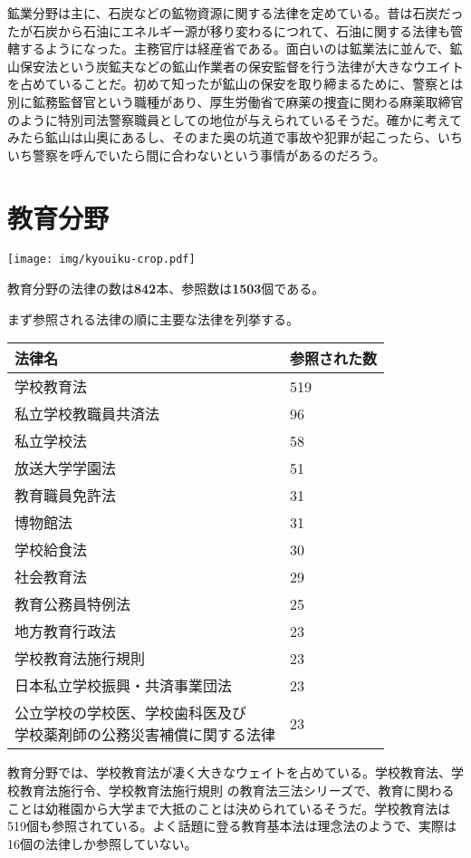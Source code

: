 \documentclass[a5j,openany,twoside]{jsbook}
\begin{document}
鉱業分野は主に、石炭などの鉱物資源に関する法律を定めている。昔は石炭だったが石炭から石油にエネルギー源が移り変わるにつれて、石油に関する法律も管轄するようになった。主務官庁は経産省である。面白いのは鉱業法に並んで、鉱山保安法という炭鉱夫などの鉱山作業者の保安監督を行う法律が大きなウエイトを占めていることだ。初めて知ったが鉱山の保安を取り締まるために、警察とは別に鉱務監督官という職種があり、厚生労働省で麻薬の捜査に関わる麻薬取締官のように特別司法警察職員としての地位が与えられているそうだ。確かに考えてみたら鉱山は山奥にあるし、そのまた奥の坑道で事故や犯罪が起こったら、いちいち警察を呼んでいたら間に合わないという事情があるのだろう。

\section{教育分野}


\texttt{[image: img/kyouiku-crop.pdf]}

教育分野の法律の数は\textbf{842}本、参照数は\textbf{1503}個である。

まず参照される法律の順に主要な法律を列挙する。


\begin{table}[htb]
  \begin{tabular}{|l|l|}  \hline
法律名 & 参照された数 \\ \hline \hline
学校教育法 & 519 \\
私立学校教職員共済法 & 96 \\
私立学校法 & 58 \\
放送大学学園法 & 51 \\
教育職員免許法 & 31 \\
博物館法 & 31 \\
学校給食法 & 30 \\
社会教育法 & 29 \\
教育公務員特例法 & 25 \\
地方教育行政法 & 23 \\
学校教育法施行規則 & 23 \\
日本私立学校振興・共済事業団法 & 23 \\
\shortstack{公立学校の学校医、学校歯科医及び \\ 学校薬剤師の公務災害補償に関する法律} & 23 \\ \hline
  \end{tabular}
\end{table}

教育分野では、学校教育法が凄く大きなウェイトを占めている。学校教育法、学校教育法施行令、学校教育法施行規則 の教育法三法シリーズで、教育に関わることは幼稚園から大学まで大抵のことは決められているそうだ。学校教育法は519個も参照されている。よく話題に登る教育基本法は理念法のようで、実際は16個の法律しか参照していない。
\end{document}
